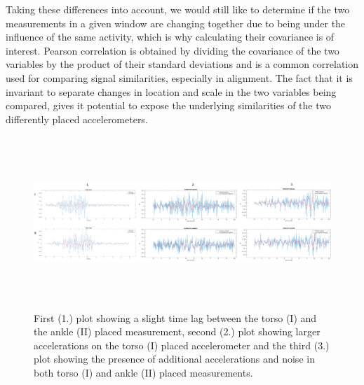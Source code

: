 \documentclass{article}
\begin{document}
{Taking these differences into account, we would still like to determine if the two measurements in a given window are changing together due to being under the influence of the same activity, which is why calculating their covariance is of interest. Pearson correlation is obtained by dividing the covariance of the two variables by the product of their standard deviations and is a common correlation used for comparing signal similarities, especially in alignment\cite{ref9}. The fact that it is invariant to separate changes in location and scale in the two variables being compared, gives it potential to expose the underlying similarities of the two differently placed accelerometers.
\begin{figure}[h]
\includegraphics[width=15cm, height=6.5cm]{differences.png}
\caption{First (1.) plot showing a slight time lag between the torso (I) and the ankle (II) placed measurement, second (2.) plot showing larger accelerations on the torso (I) placed accelerometer and the third (3.) plot showing the presence of additional accelerations and noise in both torso (I) and ankle (II) placed measurements.}
\end{figure}\\

}
\end{document}
